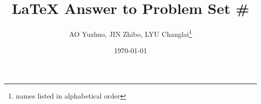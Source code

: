 \documentclass{article}
\title{\LaTeX{} Answer to Problem Set \#}
\author{AO Yuzhuo, JIN Zhibo, LYU Changlai\thanks{names listed in alphabetical order}}
\date{\today}
\begin{document}
\newtheorem{Thm}{Theorem}[section]
\newtheorem{Lem}[Thm]{Lemma}
\newtheorem{Prop}[Thm]{Proposition}
\newtheorem{Cor}[Thm]{Corollary}
\newtheorem{Rem}[Thm]{Remark}
\newtheorem{Def}[Thm]{Definition}
\def\sep{\vspace{1cm}\hrule\vspace{1cm}}
\def\tab{\;\;\;\;\;\;}
\def\R{\mathbb{R}}
\def\Q{\mathbb{Q}}
\def\N{\mathbb{N}}
\def\C{\mathbb{C}}
\def\Z{\mathbb{Z}}
\def\a{\alpha}
\def\b{\beta}
\def\c{\gamma}
\def\d{\delta}
\def\e{\epsilon}
\def\p{\partial}
\def\h{\theta}
\def\w{\omega}
\def\bu{\mathbf{u}}
\def\bv{\mathbf{v}}
\def\iff{\Longleftrightarrow}
\def\oif{\Rightarrow}
\def\to{\rightarrow}
\def\inj{\hookrightarrow}
\def\surj{\twoheadrightarrow}
\def\imply{\Longrightarrow}
\def\x{\times}
\def\<{\langle}
\def\>{\rangle}
\def\oo{\infty}
\def\normal{\triangleleft}
\def\h{\hspace*{0.5cm}}
\def\limsupa{\limsup\limits_{n\to\infty}{a_n}}
\def\limsupb{\limsup\limits_{n\to\infty}{b_n}}
\def\liminfa{\liminf\limits_{n\to\infty}{a_n}}
\def\liminfb{\liminf\limits_{n\to\infty}{b_n}}
\def\limsupn#1{\limsup\limits_{n\to\infty}\bigg({#1}\bigg)}
\def\liminfn#1{\liminf\limits_{n\to\infty}\bigg({#1}\bigg)}
\def\LIM{\text{LIM}}
\def\seqa{\{a_n\}}
\def\seqb{\{b_n\}}
\def\sseqa{\{a_{n_k}\}}
\def\st{\text{ s.t. } }
\def\when{\text{ when }}
\def\pnorm{|| \cdot ||_q}
\def\qnorm{|| \cdot ||_p}
\def\lp#1{|| {#1} ||_p}
\def\lq#1{|| {#1} ||_q}

\maketitle

\everymath{\displaystyle}

\section{}
\end{document}
